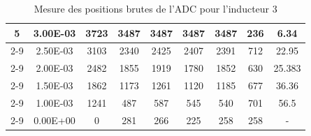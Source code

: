 \begin{table}[H]
{\begin{tabular}{|c|c|c|c|c|c|c|c|c|}
            \multirow{6}{*}{5} & 3.00E-03         & 3723      & 3487                                                       & 3487                                                      & 3487                                                      & 3487    & 236    & 6.34                                                               \\ \cline{2-9}
                               & 2.50E-03         & 3103      & 2340                                                       & 2425                                                      & 2407                                                      & 2391    & 712    & 22.95                                                              \\ \cline{2-9}
                               & 2.00E-03         & 2482      & 1855                                                       & 1919                                                      & 1780                                                      & 1852    & 630    & 25.383                                                             \\ \cline{2-9}
                               & 1.50E-03         & 1862      & 1173                                                       & 1261                                                      & 1120                                                      & 1185    & 677    & 36.36                                                              \\ \cline{2-9}
                               & 1.00E-03         & 1241      & 487                                                        & 587                                                       & 545                                                       & 540     & 701    & 56.5                                                               \\ \cline{2-9}
                               & 0.00E+00         & 0         & 281                                                        & 266                                                       & 225                                                       & 258     & 258    & -                                                                  \\ \hline
        \end{tabular}%
    }
    \caption{Mesure des positions brutes de l'ADC pour l'inducteur 3}
    \label{tab:adc_brut_inducteur3}
\end{table}

